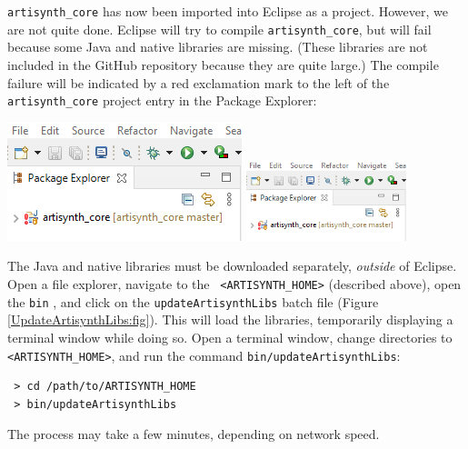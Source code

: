 
{\tt artisynth\_core} has now been imported into Eclipse as a
project. However, we are not quite done. Eclipse will try to compile
{\tt artisynth\_core}, but will fail because some Java and native
libraries are missing. (These libraries are not included in the GitHub
repository because they are quite large.) The compile failure will be
indicated by a red exclamation mark to the left of the {\tt
artisynth\_core} project entry in the Package Explorer:
\begin{center}
\iflatexml
   \includegraphics[]{images/artisynthBuildError}
\else
   \includegraphics[width=0.35\textwidth]{images/artisynthBuildError}
\fi
\end{center}

The Java and native libraries must be downloaded separately, {\it
outside} of Eclipse.  
\ifWindows
Open a file explorer, navigate to the {\tt
<ARTISYNTH\_HOME>} \directory{} (described above), open the {\tt bin}
\directory{}, and click on the {\tt updateArtisynthLibs} batch file
(Figure \ref{UpdateArtisynthLibs:fig}).
This will load the libraries, temporarily displaying a terminal window
while doing so.
\else
Open a terminal window, change directories to {\tt <ARTISYNTH\_HOME>},
and run the command {\tt bin/updateArtisynthLibs}:
\begin{verbatim}
 > cd /path/to/ARTISYNTH_HOME
 > bin/updateArtisynthLibs
\end{verbatim}
\fi
The process may take a few minutes, depending on network speed.

